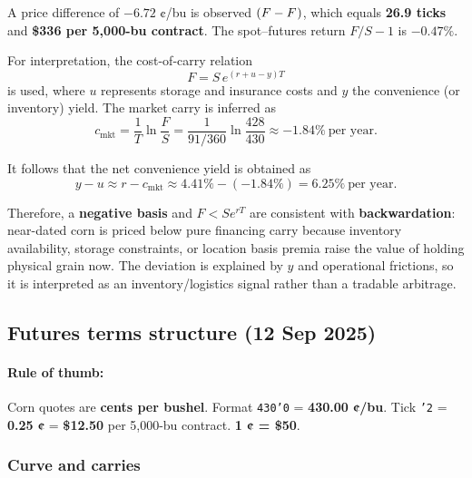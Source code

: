 \documentclass[10pt,a4paper]{article} %
\begin{document}
A price difference of $\mathbf{-6.72}$ ¢/bu is observed $(F-F^{\*})$, which equals \textbf{26.9 ticks} and \textbf{\$336 per 5,000-bu contract}. The spot–futures return $F/S-1$ is $\mathbf{-0.47\%}$.

For interpretation, the cost-of-carry relation
\[
F=S\,e^{(r+u-y)T}
\]
is used, where $u$ represents storage and insurance costs and $y$ the convenience (or inventory) yield. The market carry is inferred as
\[
c_{\text{mkt}}=\frac{1}{T}\ln\!\frac{F}{S}
=\frac{1}{91/360}\ln\!\frac{428}{430}\approx \mathbf{-1.84\%}\ \text{per year}.
\]

It follows that the net convenience yield is obtained as
\[
y-u \approx r-c_{\text{mkt}}\approx 4.41\%-(-1.84\%)=\mathbf{6.25\%}\ \text{per year}.
\]

Therefore, a \textbf{negative basis} and $F<S e^{rT}$ are consistent with \textbf{backwardation}: near-dated corn is priced below pure financing carry because inventory availability, storage constraints, or location basis premia raise the value of holding physical grain now. The deviation is explained by $y$ and operational frictions, so it is interpreted as an inventory/logistics signal rather than a tradable arbitrage.

\subsection{Futures terms structure (12 Sep 2025)}

\paragraph{Rule of thumb:} Corn quotes are \textbf{cents per bushel}. Format \texttt{430'0} = \textbf{430.00 ¢/bu}. Tick \texttt{'2} = \textbf{0.25 ¢} = \textbf{\$12.50} per 5,000-bu contract. \textbf{1 ¢ = \$50}.

\subsubsection*{Curve and carries}
\end{document}
